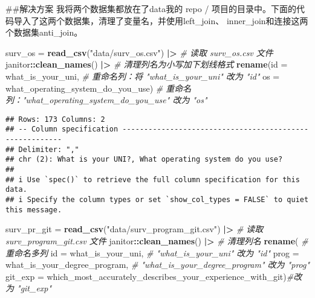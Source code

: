 \documentclass[
]{article}
\newenvironment{Shaded}{\begin{snugshade}}{\end{snugshade}}
\newcommand{\AttributeTok}[1]{\textcolor[rgb]{0.13,0.29,0.53}{#1}}
\newcommand{\CommentTok}[1]{\textcolor[rgb]{0.56,0.35,0.01}{\textit{#1}}}
\newcommand{\FunctionTok}[1]{\textcolor[rgb]{0.13,0.29,0.53}{\textbf{#1}}}
\newcommand{\NormalTok}[1]{#1}
\newcommand{\OtherTok}[1]{\textcolor[rgb]{0.56,0.35,0.01}{#1}}
\newcommand{\SpecialCharTok}[1]{\textcolor[rgb]{0.81,0.36,0.00}{\textbf{#1}}}
\newcommand{\StringTok}[1]{\textcolor[rgb]{0.31,0.60,0.02}{#1}}
\begin{document}
\#\#解决方案 我将两个数据集都放在了data我的 repo /
项目的目录中。下面的代码导入了这两个数据集，清理了变量名，并使用left\_join、
inner\_join和连接这两个数据集anti\_join。

\begin{Shaded}
\begin{Highlighting}[]
\NormalTok{surv\_os }\OtherTok{=} 
  \FunctionTok{read\_csv}\NormalTok{(}\StringTok{"data/surv\_os.csv"}\NormalTok{) }\SpecialCharTok{|\textgreater{}}                                     \CommentTok{\# 读取 surv\_os.csv 文件}
\NormalTok{  janitor}\SpecialCharTok{::}\FunctionTok{clean\_names}\NormalTok{() }\SpecialCharTok{|\textgreater{}}                                           \CommentTok{\# 清理列名为小写加下划线格式}
  \FunctionTok{rename}\NormalTok{(}\AttributeTok{id =}\NormalTok{ what\_is\_your\_uni,                                       }\CommentTok{\# 重命名列：将 "what\_is\_your\_uni" 改为 "id"}
         \AttributeTok{os =}\NormalTok{ what\_operating\_system\_do\_you\_use)                       }\CommentTok{\# 重命名列："what\_operating\_system\_do\_you\_use" 改为 "os"}
\end{Highlighting}
\end{Shaded}

\begin{verbatim}
## Rows: 173 Columns: 2
## -- Column specification --------------------------------------------------------
## Delimiter: ","
## chr (2): What is your UNI?, What operating system do you use?
## 
## i Use `spec()` to retrieve the full column specification for this data.
## i Specify the column types or set `show_col_types = FALSE` to quiet this message.
\end{verbatim}

\begin{Shaded}
\begin{Highlighting}[]
\NormalTok{surv\_pr\_git }\OtherTok{=} 
  \FunctionTok{read\_csv}\NormalTok{(}\StringTok{"data/surv\_program\_git.csv"}\NormalTok{) }\SpecialCharTok{|\textgreater{}}                           \CommentTok{\# 读取 surv\_program\_git.csv 文件}
\NormalTok{  janitor}\SpecialCharTok{::}\FunctionTok{clean\_names}\NormalTok{() }\SpecialCharTok{|\textgreater{}}                                          \CommentTok{\# 清理列名}
  \FunctionTok{rename}\NormalTok{(                                                            }\CommentTok{\# 重命名多列}
    \AttributeTok{id =}\NormalTok{ what\_is\_your\_uni,                                           }\CommentTok{\# "what\_is\_your\_uni" 改为 "id"}
    \AttributeTok{prog =}\NormalTok{ what\_is\_your\_degree\_program,                              }\CommentTok{\# "what\_is\_your\_degree\_program" 改为 "prog"}
    \AttributeTok{git\_exp =}\NormalTok{ which\_most\_accurately\_describes\_your\_experience\_with\_git)}\CommentTok{\#改为 "git\_exp"}
\end{Highlighting}
\end{Shaded}
\end{document}
